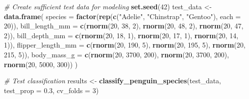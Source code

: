 \documentclass[
]{article}
\newenvironment{Shaded}{\begin{snugshade}}{\end{snugshade}}
\newcommand{\AttributeTok}[1]{\textcolor[rgb]{0.13,0.29,0.53}{#1}}
\newcommand{\CommentTok}[1]{\textcolor[rgb]{0.56,0.35,0.01}{\textit{#1}}}
\newcommand{\DecValTok}[1]{\textcolor[rgb]{0.00,0.00,0.81}{#1}}
\newcommand{\FloatTok}[1]{\textcolor[rgb]{0.00,0.00,0.81}{#1}}
\newcommand{\FunctionTok}[1]{\textcolor[rgb]{0.13,0.29,0.53}{\textbf{#1}}}
\newcommand{\NormalTok}[1]{#1}
\newcommand{\OtherTok}[1]{\textcolor[rgb]{0.56,0.35,0.01}{#1}}
\newcommand{\StringTok}[1]{\textcolor[rgb]{0.31,0.60,0.02}{#1}}
\begin{document}
\begin{Shaded}
\begin{Highlighting}[]
  \CommentTok{\# Create sufficient test data for modeling}
  \FunctionTok{set.seed}\NormalTok{(}\DecValTok{42}\NormalTok{)}
\NormalTok{  test\_data }\OtherTok{\textless{}{-}} \FunctionTok{data.frame}\NormalTok{(}
    \AttributeTok{species =} \FunctionTok{factor}\NormalTok{(}\FunctionTok{rep}\NormalTok{(}\FunctionTok{c}\NormalTok{(}\StringTok{"Adelie"}\NormalTok{, }\StringTok{"Chinstrap"}\NormalTok{, }\StringTok{"Gentoo"}\NormalTok{), }\AttributeTok{each =} \DecValTok{20}\NormalTok{)),}
    \AttributeTok{bill\_length\_mm =} \FunctionTok{c}\NormalTok{(}\FunctionTok{rnorm}\NormalTok{(}\DecValTok{20}\NormalTok{, }\DecValTok{38}\NormalTok{, }\DecValTok{2}\NormalTok{), }\FunctionTok{rnorm}\NormalTok{(}\DecValTok{20}\NormalTok{, }\DecValTok{48}\NormalTok{, }\DecValTok{2}\NormalTok{), }\FunctionTok{rnorm}\NormalTok{(}\DecValTok{20}\NormalTok{, }\DecValTok{47}\NormalTok{, }\DecValTok{2}\NormalTok{)),}
    \AttributeTok{bill\_depth\_mm =} \FunctionTok{c}\NormalTok{(}\FunctionTok{rnorm}\NormalTok{(}\DecValTok{20}\NormalTok{, }\DecValTok{18}\NormalTok{, }\DecValTok{1}\NormalTok{), }\FunctionTok{rnorm}\NormalTok{(}\DecValTok{20}\NormalTok{, }\DecValTok{17}\NormalTok{, }\DecValTok{1}\NormalTok{), }\FunctionTok{rnorm}\NormalTok{(}\DecValTok{20}\NormalTok{, }\DecValTok{14}\NormalTok{, }\DecValTok{1}\NormalTok{)),}
    \AttributeTok{flipper\_length\_mm =} \FunctionTok{c}\NormalTok{(}\FunctionTok{rnorm}\NormalTok{(}\DecValTok{20}\NormalTok{, }\DecValTok{190}\NormalTok{, }\DecValTok{5}\NormalTok{), }\FunctionTok{rnorm}\NormalTok{(}\DecValTok{20}\NormalTok{, }\DecValTok{195}\NormalTok{, }\DecValTok{5}\NormalTok{), }\FunctionTok{rnorm}\NormalTok{(}\DecValTok{20}\NormalTok{, }\DecValTok{215}\NormalTok{, }\DecValTok{5}\NormalTok{)),}
    \AttributeTok{body\_mass\_g =} \FunctionTok{c}\NormalTok{(}\FunctionTok{rnorm}\NormalTok{(}\DecValTok{20}\NormalTok{, }\DecValTok{3700}\NormalTok{, }\DecValTok{200}\NormalTok{), }\FunctionTok{rnorm}\NormalTok{(}\DecValTok{20}\NormalTok{, }\DecValTok{3700}\NormalTok{, }\DecValTok{200}\NormalTok{), }\FunctionTok{rnorm}\NormalTok{(}\DecValTok{20}\NormalTok{, }\DecValTok{5000}\NormalTok{, }\DecValTok{300}\NormalTok{))}
\NormalTok{  )}

  \CommentTok{\# Test classification}
\NormalTok{  results }\OtherTok{\textless{}{-}} \FunctionTok{classify\_penguin\_species}\NormalTok{(test\_data, }\AttributeTok{test\_prop =} \FloatTok{0.3}\NormalTok{, }\AttributeTok{cv\_folds =} \DecValTok{3}\NormalTok{)}


\end{Highlighting}
\end{Shaded}
\end{document}

